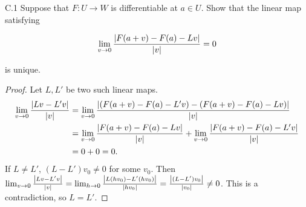 \begin{customexer}{C.1}
  Suppose that $F: U \rightarrow W$ is differentiable at $a \in U$. Show that the linear map satisfying

  \begin{align*}
    \lim_{v \rightarrow 0} \frac{\abs{F(a + v) - F(a) - Lv}}{\abs{v}} = 0
  \end{align*}

  is unique.
\end{customexer}

\begin{proof}
  Let $L, L'$ be two such linear maps.
  \begin{align*}
    \lim_{v \rightarrow 0} \frac{\abs{Lv - L'v}}{\abs{v}}
      &= \lim_{v \rightarrow 0} \frac{\abs{(F(a + v) - F(a) - L'v) - (F(a + v) - F(a) - Lv)}}{\abs{v}} \\
      &= \lim_{v \rightarrow 0} \frac{\abs{F(a + v) - F(a) - Lv}}{\abs{v}} + \lim_{v \rightarrow 0} \frac{\abs{F(a + v) - F(a) - L'v}}{\abs{v}} \\
      &= 0 + 0 = 0.
  \end{align*}
  If $L \ne L'$, $(L - L')v_0 \ne 0$ for some $v_0$.
  Then $\lim_{v \rightarrow 0} \frac{\abs{Lv - L'v}}{\abs{v}} = \lim_{h \rightarrow 0} \frac{\abs{L(hv_0) - L'(hv_0)}}{\abs{hv_0}} = \frac{\abs{(L - L')v_0}}{\abs{v_0}} \ne 0$.
  This is a contradiction, so $L = L'$.
\end{proof}

